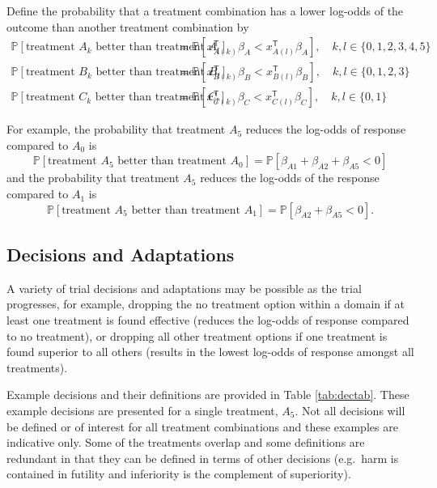 \documentclass[
]{article}
\begin{document}
Define the probability that a treatment combination has a lower log-odds of the outcome than another treatment combination by
\[
\begin{aligned}
\mathbb P[\text{treatment }A_k\text{ better than treatment } A_l] &=\mathbb P\left[x_{A(k)}^{\mathsf{T}}\beta_A < x_{A(l)}^{\mathsf{T}}\beta_A\right],\quad k,l\in\{0,1,2,3,4,5\} \\
\mathbb P[\text{treatment }B_k\text{ better than treatment } B_l] &=\mathbb P\left[x_{B(k)}^{\mathsf{T}}\beta_B < x_{B(l)}^{\mathsf{T}}\beta_B\right],\quad k,l\in\{0,1,2,3\} \\
\mathbb P[\text{treatment }C_k\text{ better than treatment } C_l] &=\mathbb P\left[x_{C(k)}^{\mathsf{T}}\beta_C < x_{C(l)}^{\mathsf{T}}\beta_C\right],\quad k,l\in\{0,1\}
\end{aligned}
\]

For example, the probability that treatment \(A_5\) reduces the log-odds of response compared to \(A_0\) is
\[
\mathbb P[\text{treatment } A_5\text{ better than treatment } A_0] = \mathbb P[\beta_{A1}+\beta_{A2}+\beta_{A5}<0]
\]
and the probability that treatment \(A_5\) reduces the log-odds of the response compared to \(A_1\) is
\[
\mathbb P[\text{treatment } A_5\text{ better than treatment } A_1] = \mathbb P[\beta_{A2}+\beta_{A5}<0].
\]

\hypertarget{decisions-and-adaptations}{%
\subsection{Decisions and Adaptations}\label{decisions-and-adaptations}}

A variety of trial decisions and adaptations may be possible as the trial progresses, for example, dropping the no treatment option within a domain if at least one treatment is found effective (reduces the log-odds of response compared to no treatment), or dropping all other treatment options if one treatment is found superior to all others (results in the lowest log-odds of response amongst all treatments).

Example decisions and their definitions are provided in Table \ref{tab:dectab}.
These example decisions are presented for a single treatment, \(A_5\).
Not all decisions will be defined or of interest for all treatment combinations and these examples are indicative only.
Some of the treatments overlap and some definitions are redundant in that they can be defined in terms of other decisions (e.g.~harm is contained in futility and inferiority is the complement of superiority).
\end{document}
